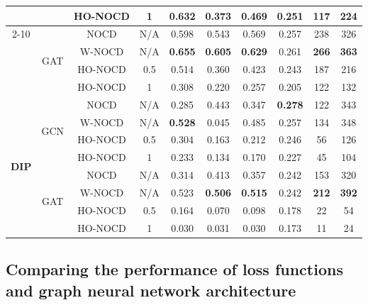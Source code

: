 \begin{table}[h]
\begin{tabular}{c| c c c | c c c c c c}
		& & HO-NOCD & 1
		& 0.632 & 0.373 & 0.469 & 0.251 & 117 & 224
		\\
		\cline{2-10}
		
		& \multirow{4}{*}{GAT}
		& NOCD & N/A
		& 0.598 & 0.543 & 0.569 & 0.257 & 238 & 326
		\\
		
		& & W-NOCD & N/A
		& \textbf{0.655} & \textbf{0.605} & \textbf{0.629} & 0.261 & \textbf{266} & \textbf{363}
		\\
		
		& & HO-NOCD & 0.5
		& 0.514 & 0.360 & 0.423 & 0.243 & 187 & 216
		\\
		
		& & HO-NOCD & 1
		& 0.308 & 0.220 & 0.257 & 0.205 & 122 & 132
		\\
		
		\hline
		
		\multirow{8}{*}{\textbf{DIP}}
		& \multirow{4}{*}{GCN}
		& NOCD & N/A
		& 0.285 & 0.443 & 0.347 & \textbf{0.278} & 122 & 343
		\\
		
		& & W-NOCD & N/A
		& \textbf{0.528} & 0.045 & 0.485 & 0.257 & 134 & 348
		\\
		
		& & HO-NOCD & 0.5
		& 0.304 & 0.163 & 0.212 & 0.246 & 56 & 126
		\\
		
		& & HO-NOCD & 1
		& 0.233 & 0.134 & 0.170 & 0.227 & 45 & 104
		\\
		\cline{2-10}
		
		& \multirow{4}{*}{GAT}
		& NOCD & N/A
		& 0.314 & 0.413 & 0.357 & 0.242 & 153 & 320
		\\
		
		& & W-NOCD & N/A
		& 0.523 & \textbf{0.506} & \textbf{0.515} & 0.242 & \textbf{212} & \textbf{392}
		\\
		
		& & HO-NOCD & 0.5
		& 0.164 & 0.070 & 0.098 & 0.178 & 22 & 54
		\\
		
		& & HO-NOCD & 1
		& 0.030 & 0.031 & 0.030 & 0.173 & 11 & 24
		\\
		
		\hline
	\end{tabular}
\end{table}


\subsection{Comparing the performance of loss functions and graph neural network architecture}

